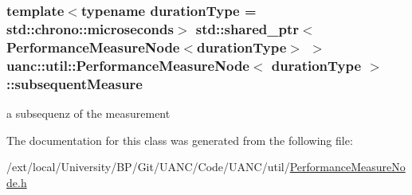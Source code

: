 \subsubsection[{\texorpdfstring{subsequent\+Measure}{subsequentMeasure}}]{\setlength{\rightskip}{0pt plus 5cm}template$<$typename duration\+Type  = std\+::chrono\+::microseconds$>$ std\+::shared\+\_\+ptr$<${\bf Performance\+Measure\+Node}$<$duration\+Type$>$ $>$ {\bf uanc\+::util\+::\+Performance\+Measure\+Node}$<$ duration\+Type $>$\+::subsequent\+Measure}\hypertarget{classuanc_1_1util_1_1_performance_measure_node_a48b59e75db03b65e2dc2dfd7bbdf05bb}{}\label{classuanc_1_1util_1_1_performance_measure_node_a48b59e75db03b65e2dc2dfd7bbdf05bb}
a subsequenz of the measurement 

The documentation for this class was generated from the following file\+:\begin{DoxyCompactItemize}
\item 
/ext/local/\+University/\+B\+P/\+Git/\+U\+A\+N\+C/\+Code/\+U\+A\+N\+C/util/\hyperlink{_performance_measure_node_8h}{Performance\+Measure\+Node.\+h}\end{DoxyCompactItemize}

